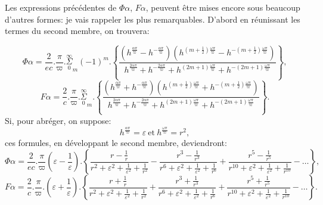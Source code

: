 \documentclass{article}
\begin{document}
Les expressions précédentes de $\Phi\alpha$, $F\alpha$, peuvent être mises encore sous beaucoup d'autres formes: je vais rappeler les plus remarquables. D'abord en réunissant les termes du second membre, on trouvera:

\[
\Phi\alpha = \frac{2}{ec}.\frac{\pi}{\varpi}.\overset{\infty}{\underset{0}{\Sigma}}_{m}(-1)^{m}.\left\{\frac{\left(h^{\frac{\alpha\pi}{\varpi}}-h^{-\frac{\alpha\pi}{\varpi}}\right)\left(h^{(m+\frac{1}{2})\frac{\omega\pi}{\varpi}}-h^{-(m+\frac{1}{2})\frac{\omega\pi}{\varpi}}\right)}{h^{\frac{2\alpha\pi}{\varpi}}+h^{-\frac{2\alpha\pi}{\varpi}}+h^{(2m+1)\frac{\omega\pi}{\varpi}}+h^{-(2m+1)\frac{\omega\pi}{\varpi}}}\right\},
\tag{192.}
\]
\[
F\alpha = \frac{2}{c}.\frac{\pi}{\varpi}.\overset{\infty}{\underset{0}{\Sigma}}_{m}.\left\{\frac{\left(h^{\frac{\alpha\pi}{\varpi}}+h^{-\frac{\alpha\pi}{\varpi}}\right)\left(h^{(m+\frac{1}{2})\frac{\omega\pi}{\varpi}}+h^{-(m+\frac{1}{2})\frac{\omega\pi}{\varpi}}\right)}{h^{\frac{2\alpha\pi}{\varpi}}+h^{-\frac{2\alpha\pi}{\varpi}}+h^{(2m+1)\frac{\omega\pi}{\varpi}}+h^{-(2m+1)\frac{\omega\pi}{\varpi}}}\right\}.
\tag{193.}
\]
Si, pour abréger, on suppose:
\[
h^{\frac{\alpha\pi}{\varpi}} = \varepsilon\ \text{et}\ h^{\frac{\omega\pi}{\varpi}} = r^{2},
\tag{194.}
\]
ces formules, en développant le second membre, deviendront:
\[
\Phi\alpha = \frac{2}{ec}.\frac{\pi}{\varpi}\left(\varepsilon-\frac{1}{\varepsilon}\right).\left\{\frac{r-\frac{1}{r}}{r^{2}+\varepsilon^{2}+\frac{1}{\varepsilon^{2}}+\frac{1}{r^{2}}}-\frac{r^{3}-\frac{1}{r^{3}}}{r^{6}+\varepsilon^{2}+\frac{1}{\varepsilon^{2}}+\frac{1}{r^{6}}}+\frac{r^{5}-\frac{1}{r^{5}}}{r^{10}+\varepsilon^{2}+\frac{1}{\varepsilon^{2}}+\frac{1}{r^{10}}}-\ldots\right\},
\tag{195.}
\]
\[
F\alpha = \frac{2}{c}.\frac{\pi}{\varpi}.\left(\varepsilon+\frac{1}{\varepsilon}\right).\left\{\frac{r+\frac{1}{r}}{r^{2}+\varepsilon^{2}+\frac{1}{\varepsilon^{2}}+\frac{1}{r^{2}}}+\frac{r^{3}+\frac{1}{r^{3}}}{r^{6}+\varepsilon^{2}+\frac{1}{\varepsilon^{2}}+\frac{1}{r^{6}}}+\frac{r^{5}+\frac{1}{r^{5}}}{r^{10}+\varepsilon^{2}+\frac{1}{\varepsilon^{2}}+\frac{1}{r^{10}}}-\ldots\right\}.
\tag{196.}
\]
\end{document}
